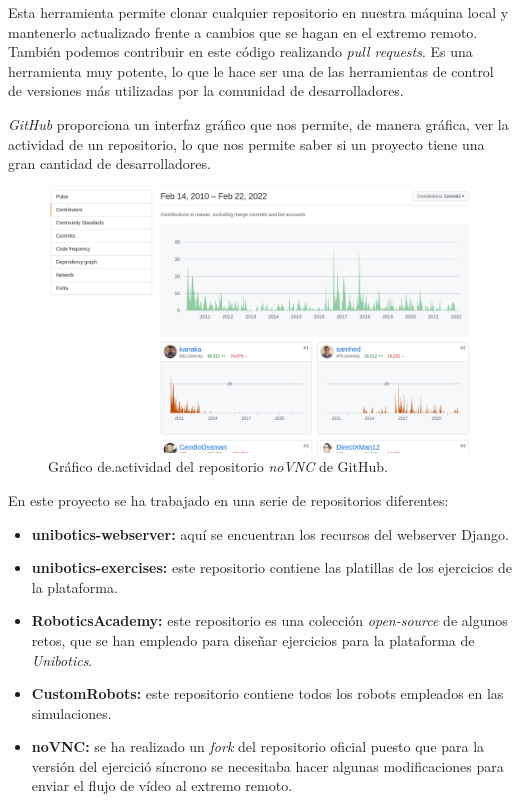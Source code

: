 \documentclass[a4paper, 12pt]{book}
\begin{document}
Esta herramienta permite clonar cualquier repositorio en nuestra máquina local y mantenerlo actualizado frente a cambios que se hagan en el extremo remoto. También podemos contribuir en este código realizando \emph{pull requests}. Es una herramienta muy potente, lo que le hace ser una de las herramientas de control de versiones más utilizadas por la comunidad de desarrolladores.

\emph{GitHub} proporciona un interfaz gráfico que nos permite, de manera gráfica, ver la actividad de un repositorio, lo que nos permite saber si un proyecto tiene una gran cantidad de desarrolladores.

\begin{figure}[H]
	\centering
    \includegraphics[width=15cm]{img/github_contributors.png}
    \caption{Gráfico de.actividad del repositorio \emph{noVNC} de GitHub.}
    \label{figura:simulador_gazebo}
\end{figure}

En este proyecto se ha trabajado en una serie de repositorios diferentes:

\begin{itemize}
\item \textbf{unibotics-webserver:} aquí se encuentran los recursos del webserver Django.
\item \textbf{unibotics-exercises:} este repositorio contiene las platillas de los ejercicios de la plataforma.
\item \textbf{RoboticsAcademy:} este repositorio es una colección \emph{open-source} de algunos retos, que se han empleado para diseñar ejercicios para la plataforma de \emph{Unibotics}.
\item \textbf{CustomRobots:} este repositorio contiene todos los robots empleados en las simulaciones.
\item \textbf{noVNC:} se ha realizado un \emph{fork} del repositorio oficial puesto que para la versión del ejercició síncrono se necesitaba hacer algunas modificaciones para enviar el flujo de vídeo al extremo remoto.
\end{itemize}
\end{document}
